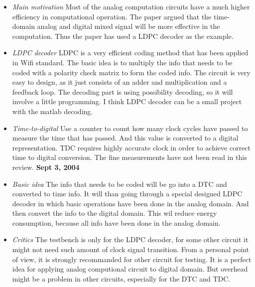 \documentclass[]{article}
\begin{document}
\indent		\begin{itemize}
			\item \textit{Main motivation}  Most of the analog computation circuits have a much higher efficiency in computational operation.
            The paper argued that the time-domain analog and digital mixed signal will be more effective in the computation. 
            Thus the paper has used a LDPC decoder as the example.

			\item \textit{LDPC decoder} LDPC is a very efficient coding method that has been applied in Wifi standard.
            The basic idea is to multiply the info that needs to be coded with a polarity check matrix to form the coded info.
            The circuit is very easy to design, as it just consists of an adder and multiplication and a feedback loop.
            The decoding part is using possibility decoding, so it will involve a little programming.
            I think LDPC decoder can be a small project with the matlab decoding.

            \item \textit{Time-to-digital} Use a counter to count how many clock cycles have passed to measure the time that has passed.
            And this value is converted to a digital representation. 
            TDC requires highly accurate clock in order to achieve correct time to digital conversion.
            The fine measurements have not been read in this review. \textbf{Sept 3, 2004}

            \item \textit{Basic idea} The info that needs to be coded will be go into a DTC and converted to time info. 
            It will than going through a special designed LDPC decoder in which basic operations have been done in the analog domain.
            And then convert the info to the digital domain. 
            This wil reduce energy consumption, because all info have been done in the analog domain.

            \item \textit{Critics} The testbench is only for the LDPC decoder, for some other circuit it might not need such amount of clock signal transition.
            From a personal point of view, it is strongly recommanded for other circuit for testing. 
            It is a perfect idea for applying analog computional circuit to digital domain.
            But overhead might be a problem in other circuits, especially for the DTC and TDC.

        \end{itemize}
\end{document}
